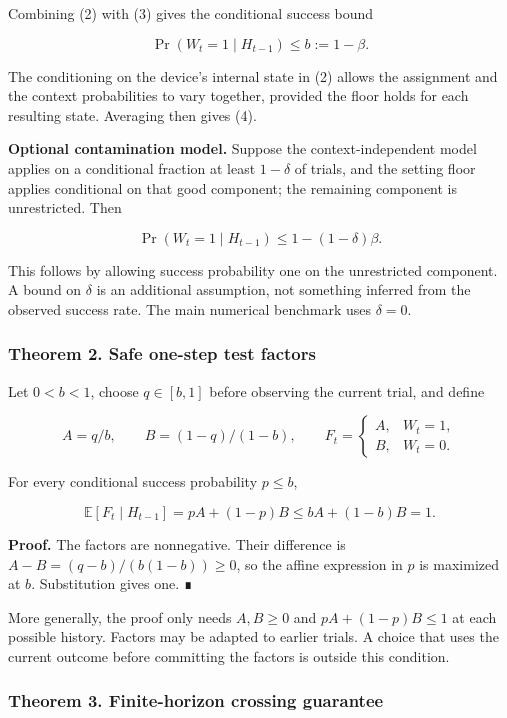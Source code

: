 \documentclass[10pt,a4paper]{article}
\begin{document}
Combining (2) with (3) gives the conditional success bound

\[
\Pr(W_t=1\mid H_{t-1})\le b:=1-\beta. \tag{4}
\]

The conditioning on the device's internal state in (2) allows the
assignment and the context probabilities to vary together, provided the
floor holds for each resulting state. Averaging then gives (4).

\textbf{Optional contamination model.} Suppose the context-independent
model applies on a conditional fraction at least \(1-\delta\) of trials,
and the setting floor applies conditional on that good component; the
remaining component is unrestricted. Then

\[
\Pr(W_t=1\mid H_{t-1})\le1-(1-\delta)\beta. \tag{5}
\]

This follows by allowing success probability one on the unrestricted
component. A bound on \(\delta\) is an additional assumption, not
something inferred from the observed success rate. The main numerical
benchmark uses \(\delta=0\).

\subsubsection{Theorem 2. Safe one-step test
factors}\label{theorem-2.-safe-one-step-test-factors}

Let \(0<b<1\), choose \(q\in[b,1]\) before observing the current trial,
and define

\[
A=q/b,\qquad B=(1-q)/(1-b),\qquad
F_t=\begin{cases}A,&W_t=1,\\B,&W_t=0.\end{cases} \tag{6}
\]

For every conditional success probability \(p\le b\),

\[
\mathbb E[F_t\mid H_{t-1}]
=pA+(1-p)B
\le bA+(1-b)B=1. \tag{7}
\]

\textbf{Proof.} The factors are nonnegative. Their difference is
\(A-B=(q-b)/(b(1-b))\ge0\), so the affine expression in \(p\) is
maximized at \(b\). Substitution gives one. ∎

More generally, the proof only needs \(A,B\ge0\) and \(pA+(1-p)B\le1\)
at each possible history. Factors may be adapted to earlier trials. A
choice that uses the current outcome before committing the factors is
outside this condition.

\subsubsection{Theorem 3. Finite-horizon crossing
guarantee}\label{theorem-3.-finite-horizon-crossing-guarantee}
\end{document}
